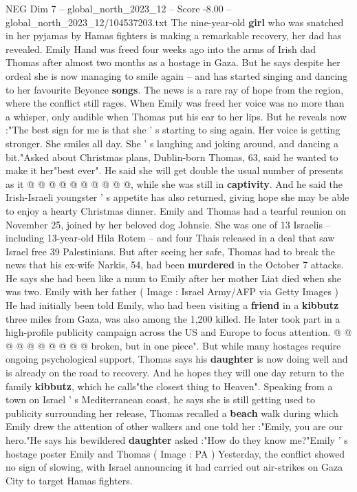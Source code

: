 \begin{textsample}{NEG Dim 7 – global\_north\_2023\_12 – Score -8.00 – global\_north\_2023\_12/104537203.txt}  \label{ex:f7_neg_150}
The nine-year-old \textbf{girl} who was snatched in her pyjamas by Hamas fighters is making a remarkable recovery, her dad has revealed.
Emily Hand was freed four weeks ago into the arms of Irish dad Thomas after almost two months as a hostage in Gaza.
But he says despite her ordeal she is now managing to smile again -- and has started singing and dancing to her favourite Beyonce \textbf{songs}.
The news is a rare ray of hope from the region, where the conflict still rages.
When Emily was freed her voice was no more than a whisper, only audible when Thomas put his ear to her lips.
But he reveals now :"The best sign for me is that she ' s starting to sing again.
Her voice is getting stronger.
She smiles all day.
She ' s laughing and joking around, and dancing a bit."Asked about Christmas plans, Dublin-born Thomas, 63, said he wanted to make it her"best ever".
He said she will get double the usual number of presents as it @ @ @ @ @ @ @ @ @ @, while she was still in \textbf{captivity}.
And he said the Irish-Israeli youngster ' s appetite has also returned, giving hope she may be able to enjoy a hearty Christmas dinner.
Emily and Thomas had a tearful reunion on November 25, joined by her beloved dog Johnsie.
She was one of 13 Israelis -- including 13-year-old Hila Rotem -- and four Thais released in a deal that saw Israel free 39 Palestinians.
But after seeing her safe, Thomas had to break the news that his ex-wife Narkis, 54, had been \textbf{murdered} in the October 7 attacks.
He says she had been like a mum to Emily after her mother Liat died when she was two.
Emily with her father ( Image : Israel Army/AFP via Getty Images ) He had initially been told Emily, who had been visiting a \textbf{friend} in a \textbf{kibbutz} three miles from Gaza, was also among the 1,200 killed.
He later took part in a high-profile publicity campaign across the US and Europe to focus attention. @ @ @ @ @ @ @ @ @ @ broken, but in one piece".
But while many hostages require ongoing psychological support, Thomas says his \textbf{daughter} is now doing well and is already on the road to recovery.
And he hopes they will one day return to the family \textbf{kibbutz}, which he calls"the closest thing to Heaven".
Speaking from a town on Israel ' s Mediterranean coast, he says she is still getting used to publicity surrounding her release, Thomas recalled a \textbf{beach} walk during which Emily drew the attention of other walkers and one told her :"Emily, you are our hero."He says his bewildered \textbf{daughter} asked :"How do they know me?"Emily ' s hostage poster Emily and Thomas ( Image : PA ) Yesterday, the conflict showed no sign of slowing, with Israel announcing it had carried out air-strikes on Gaza City to target Hamas fighters.

\end{textsample}
